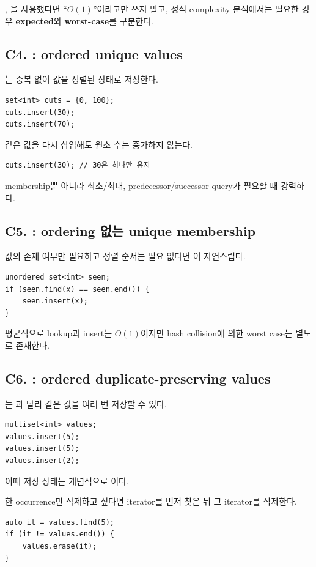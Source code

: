 \begin{keybox}
, 을 사용했다면 ``$O(1)$''이라고만 쓰지 말고, 정식 complexity 분석에서는 필요한 경우 \textbf{expected}와 \textbf{worst-case}를 구분한다.
\end{keybox}

\subsection{C4. : ordered unique values}
는 중복 없이 값을 정렬된 상태로 저장한다.
\begin{lstlisting}
set<int> cuts = {0, 100};
cuts.insert(30);
cuts.insert(70);
\end{lstlisting}

같은 값을 다시 삽입해도 원소 수는 증가하지 않는다.
\begin{lstlisting}
cuts.insert(30); // 30은 하나만 유지
\end{lstlisting}

membership뿐 아니라 최소/최대, predecessor/successor query가 필요할 때 강력하다.

\subsection{C5. : ordering 없는 unique membership}
값의 존재 여부만 필요하고 정렬 순서는 필요 없다면 이 자연스럽다.
\begin{lstlisting}
unordered_set<int> seen;
if (seen.find(x) == seen.end()) {
    seen.insert(x);
}
\end{lstlisting}

평균적으로 lookup과 insert는 $O(1)$이지만 hash collision에 의한 worst case는 별도로 존재한다.

\subsection{C6. : ordered duplicate-preserving values}
는 과 달리 같은 값을 여러 번 저장할 수 있다.
\begin{lstlisting}
multiset<int> values;
values.insert(5);
values.insert(5);
values.insert(2);
\end{lstlisting}

이때 저장 상태는 개념적으로 이다.

한 occurrence만 삭제하고 싶다면 iterator를 먼저 찾은 뒤 그 iterator를 삭제한다.
\begin{lstlisting}
auto it = values.find(5);
if (it != values.end()) {
    values.erase(it);
}
\end{lstlisting}

